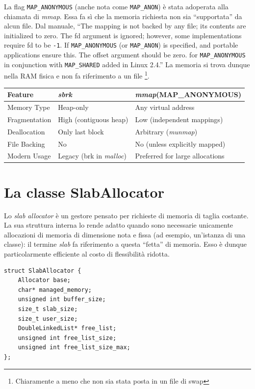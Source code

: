 La flag \texttt{MAP\_ANONYMOUS} (anche nota come \texttt{MAP\_ANON}) è stata adoperata alla chiamata di \textit{mmap}. Essa fa sì che la memoria richiesta non sia “supportata” da alcun file. Dal manuale, “The mapping is not backed by any file; its contents are initialized to zero. The fd argument is ignored; however, some implementations require fd to be \texttt{-1}. If \texttt{MAP\_ANONYMOUS} (or \texttt{MAP\_ANON}) is specified, and portable applications ensure this. The offset argument should be zero. for \texttt{MAP\_ANONYMOUS} in conjunction with \texttt{MAP\_SHARED} added in Linux 2.4.” La memoria si trova dunque nella RAM fisica e non fa riferimento a un file \footnote{Chiaramente a meno che non sia stata posta in un file di swap}.

\begin{center}
\begin{tabular}{|l|l|l|}
\hline
Feature & \textit{sbrk} & \textit{mmap}(MAP\_ANONYMOUS) \\
\hline
Memory Type & Heap-only & Any virtual address \\
Fragmentation & High (contiguous heap) & Low (independent mappings) \\
Deallocation & Only last block & Arbitrary (\textit{munmap}) \\
File Backing & No & No (unless explicitly mapped) \\
Modern Usage & Legacy (brk in \textit{malloc}) & Preferred for large allocations \\
\hline
\end{tabular}
\end{center}


\section{La classe SlabAllocator}
Lo \textit{slab allocator} è un gestore pensato per richieste di memoria di taglia costante. La sua struttura interna lo rende adatto quando sono necessarie unicamente allocazioni di memoria di dimensione nota e fissa (ad esempio, un'istanza di una classe): il termine \textit{slab} fa riferimento a questa “fetta” di memoria. Esso è dunque particolarmente efficiente al costo di flessibilità ridotta.

\begin{lstlisting}
struct SlabAllocator {
    Allocator base;
    char* managed_memory;
    unsigned int buffer_size;
    size_t slab_size;   
    size_t user_size;
    DoubleLinkedList* free_list;   
    unsigned int free_list_size;
    unsigned int free_list_size_max;
};
\end{lstlisting}

